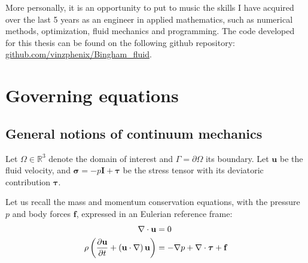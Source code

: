 \documentclass[11 pt]{report}
\begin{document}
More personally, it is an opportunity to put to music the skills I have acquired over the last 5 years as an engineer in applied mathematics, such as numerical methods, optimization, fluid mechanics and programming. The code developed for this thesis can be found on the following github repository: \url{github.com/vinzphenix/Bingham\_fluid}.

\chapter{Governing equations}
\label{chap:chapEq}

\section{General notions of continuum mechanics}
Let $\Omega \in \mathbb{R}^3$ denote the domain of interest and $\Gamma=\partial \Omega$ its boundary. Let $\mathbf{u}$ be the fluid velocity, and $\boldsymbol{\sigma}=-p\mathbf{I}+\boldsymbol{\tau}$ be the stress tensor with its deviatoric contribution $\boldsymbol\tau$.

Let us recall the mass and momentum conservation equations, with the pressure $p$ and body forces $\mathbf{f}$, expressed in an Eulerian reference frame:
\begin{align}
    \nabla \cdot \mathbf{u} &= 0\\
    \rho \left(\pdv{\mathbf{u}}{t} + \left(\mathbf{u} \cdot \nabla\right) \mathbf{u}\right) &= -\nabla p + \nabla \cdot \boldsymbol\tau + \mathbf{f} \label{eq:full_momentum}
\end{align}

\end{document}
